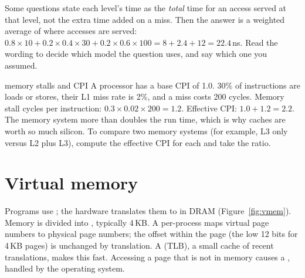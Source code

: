 \begin{trap}
Some questions state each level's time as the \emph{total} time for an access served at that level, not the extra time added on a miss. Then the answer is a weighted average of where accesses are served: $0.8 \times 10 + 0.2 \times 0.4 \times 30 + 0.2 \times 0.6 \times 100 = 8 + 2.4 + 12 = 22.4$\,ns. Read the wording to decide which model the question uses, and say which one you assumed.
\end{trap}

\begin{worked}{memory stalls and CPI}
A processor has a base CPI of 1.0. 30\% of instructions are loads or stores, their L1 miss rate is 2\%, and a miss costs 200 cycles. Memory stall cycles per instruction: $0.3 \times 0.02 \times 200 = 1.2$. Effective CPI: $1.0 + 1.2 = 2.2$. The memory system more than doubles the run time, which is why caches are worth so much silicon. To compare two memory systems (for example, L3 only versus L2 plus L3), compute the effective CPI for each and take the ratio.
\end{worked}

\section{Virtual memory}

Programs use ; the hardware translates them to  in DRAM (Figure~\ref{fig:vmem}). Memory is divided into , typically 4\,KB. A per-process  maps virtual page numbers to physical page numbers; the offset within the page (the low 12 bits for 4\,KB pages) is unchanged by translation. A  (TLB), a small cache of recent translations, makes this fast. Accessing a page that is not in memory causes a , handled by the operating system.

